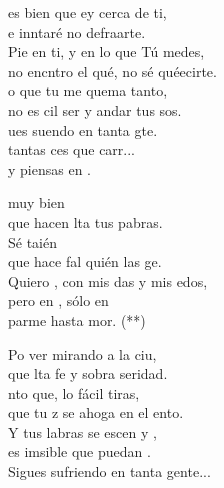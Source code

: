 \begin{cancion}[Piensas en mí][Nico]%
	es bien que ey cerca de ti,\\
	e inntaré no defraarte.\\
	Pie en ti, y en lo que Tú medes,\\
	no encntro el qué, no sé quéecirte.\\
	o que tu  me quema tanto,\\
	no es cil ser y andar tus sos.\\
	\jump
	ues suendo en tanta gte.  \\
	 tantas ces que carr...\\
	y  piensas en .\jump\\
	\begin{chorus}%
		 muy bien \\
		que hacen lta tus pabras. \\
		Sé taién \\
		que hace fal quién las ge. \\
		Quiero , con mis das y mis edos,\\
		pero en , sólo en \\
		parme hasta mor. (**)\jump\\
	\end{chorus}%
	Po ver mirando a la ciu,\\
	que lta fe y sobra seridad.\\
	nto que, lo fácil tiras,\\
	que tu z se ahoga en el ento.\\
	Y tus labras se escen y ,\\
	es imsible que puedan .\\
	\jump
Sigues sufriendo en tanta gente...\\
\end{cancion}%
